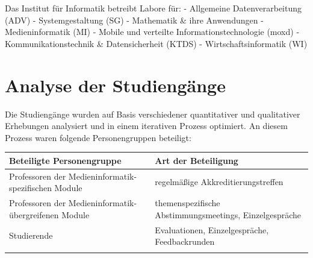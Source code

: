 Das Institut für Informatik betreibt Labore für: - Allgemeine
Datenverarbeitung (ADV) - Systemgestaltung (SG) - Mathematik \& ihre
Anwendungen - Medieninformatik (MI) - Mobile und verteilte
Informationstechnologie (moxd) - Kommunikationstechnik \&
Datensicherheit (KTDS) - Wirtschaftsinformatik (WI)

\chapter{Analyse der Studiengänge}\label{analyse-der-studienguxe4nge}

Die Studiengänge wurden auf Basis verschiedener quantitativer und
qualitativer Erhebungen analysiert und in einem iterativen Prozess
optimiert. An diesem Prozess waren folgende Personengruppen beteiligt:

\begin{longtable}[]{@{}ll@{}}
\toprule
\begin{minipage}[b]{0.5\columnwidth}\raggedright\strut
Beteiligte Personengruppe\strut
\end{minipage} & \begin{minipage}[b]{0.5\columnwidth}\raggedright\strut
Art der Beteiligung\strut
\end{minipage}\tabularnewline
\midrule
\endhead
\begin{minipage}[t]{0.5\columnwidth}\raggedright\strut
Professoren der Medieninformatik-spezifischen Module\strut
\end{minipage} & \begin{minipage}[t]{0.5\columnwidth}\raggedright\strut
regelmäßige Akkreditierungstreffen\strut
\end{minipage}\tabularnewline
\begin{minipage}[t]{0.5\columnwidth}\raggedright\strut
Professoren der Medieninformatik-übergreifenen Module\strut
\end{minipage} & \begin{minipage}[t]{0.5\columnwidth}\raggedright\strut
themenspezifische Abstimmungsmeetings, Einzelgespräche\strut
\end{minipage}\tabularnewline
\begin{minipage}[t]{0.5\columnwidth}\raggedright\strut
Studierende\strut
\end{minipage} & \begin{minipage}[t]{0.5\columnwidth}\raggedright\strut
Evaluationen, Einzelgespräche, Feedbackrunden\strut
\end{minipage}\tabularnewline
\begin{minipage}[t]{0.5\columnwidth}\raggedright\strut

\end{minipage}
\end{longtable}

